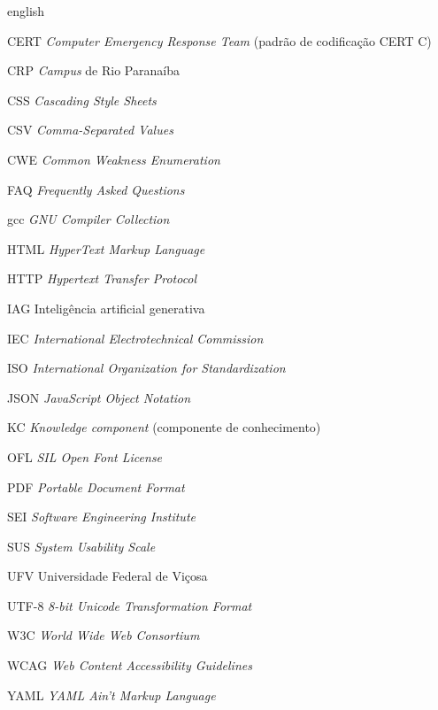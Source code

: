 \documentclass[
12pt,
openright,
oneside,
a4paper,
sumario=tradicional,
english,
brazil
]{abntex2}
\newcommand{\listofquadrosname}{Lista de quadros}
\begin{document}
	\setlength{\absparsep}{18pt}
	\begin{resumo}
		\SingleSpacing
		\noindent
		
	\end{resumo}

	\begin{resumo}[Abstract]
		\SingleSpacing
		\begin{otherlanguage*}{english}
			\noindent
			
		\end{otherlanguage*}
	\end{resumo}

	\listoffigures*
	\cleardoublepage

	\pdfbookmark[0]{\listofquadrosname}{loq}
	\listofquadros*
	\cleardoublepage

	\begin{siglas}
		\item[CERT]  \textit{Computer Emergency Response Team} (padrão de codificação CERT C)
		\item[CRP]   \textit{Campus} de Rio Paranaíba
		\item[CSS]   \textit{Cascading Style Sheets}
		\item[CSV]   \textit{Comma-Separated Values}
		\item[CWE]   \textit{Common Weakness Enumeration}
		\item[FAQ]   \textit{Frequently Asked Questions}
		\item[gcc]   \textit{GNU Compiler Collection}
		\item[HTML]  \textit{HyperText Markup Language}
		\item[HTTP]  \textit{Hypertext Transfer Protocol}
		\item[IAG]   Inteligência artificial generativa
		\item[IEC]   \textit{International Electrotechnical Commission}
		\item[ISO]   \textit{International Organization for Standardization}
		\item[JSON]  \textit{JavaScript Object Notation}
		\item[KC]    \textit{Knowledge component} (componente de conhecimento)
		\item[OFL]   \textit{SIL Open Font License}
		\item[PDF]   \textit{Portable Document Format}
		\item[SEI]   \textit{Software Engineering Institute}
		\item[SUS]   \textit{System Usability Scale}
		\item[UFV]   Universidade Federal de Viçosa
		\item[UTF-8] \textit{8-bit Unicode Transformation Format}
		\item[W3C]   \textit{World Wide Web Consortium}
		\item[WCAG]  \textit{Web Content Accessibility Guidelines}
		\item[YAML]  \textit{YAML Ain't Markup Language}
	\end{siglas}
\end{document}
